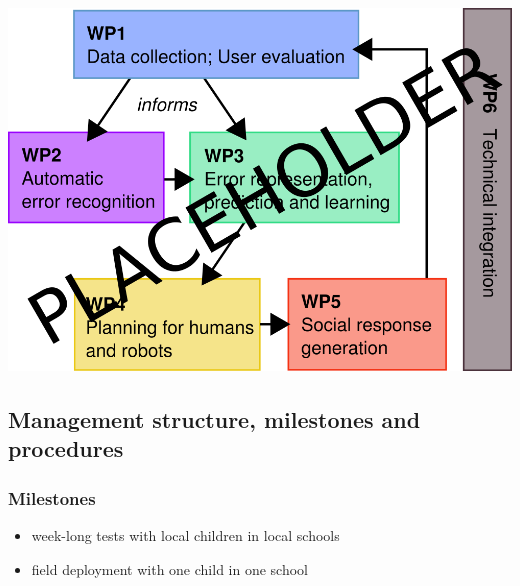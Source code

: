 \documentclass[]{article}
\providecommand{\tightlist}{%
  \setlength{\itemsep}{0pt}\setlength{\parskip}{0pt}}
\begin{document}
\includegraphics{figs/wp-interrelations.png}\\

\hypertarget{management-structure-milestones-and-procedures}{%
\subsection{Management structure, milestones and
procedures}\label{management-structure-milestones-and-procedures}}

\hypertarget{milestones}{%
\subsubsection{Milestones}\label{milestones}}

\begin{itemize}
\tightlist
\item
  week-long tests with local children in local schools
\item
  field deployment with one child in one school
\end{itemize}
\end{document}
